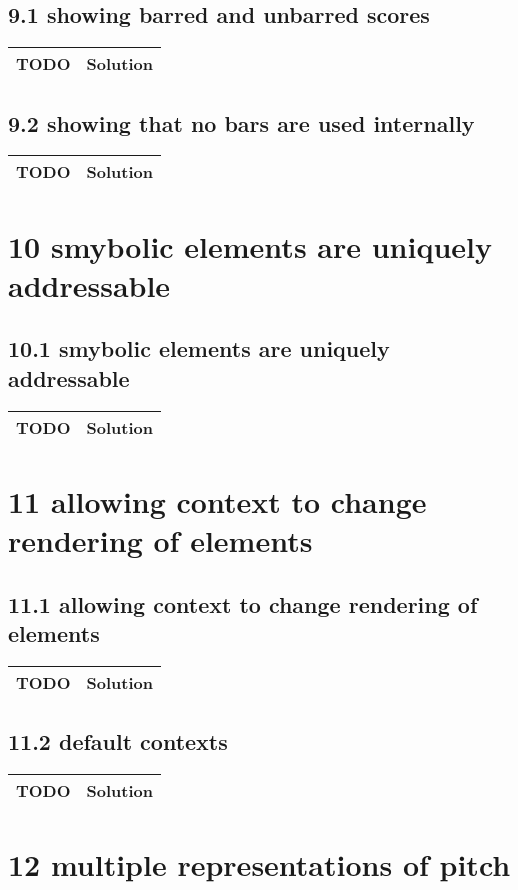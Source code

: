  \subsection*{9.1 showing barred and unbarred scores}
 \begin{tabular}{|p{}|p{}|}
 \hline
 \textbf{TODO} &
 \textbf{Solution} 
\\
 \hline
 \end{tabular} \subsection*{9.2 showing that no bars are used internally}
 \begin{tabular}{|p{}|p{}|}
 \hline
 \textbf{TODO} &
 \textbf{Solution} 
\\
 \hline
 \end{tabular} \section*{10 smybolic elements are uniquely addressable}
 \subsection*{10.1 smybolic elements are uniquely addressable}
 \begin{tabular}{|p{}|p{}|}
 \hline
 \textbf{TODO} &
 \textbf{Solution} 
\\
 \hline
 \end{tabular} \section*{11 allowing context to change rendering of elements}
 \subsection*{11.1 allowing context to change rendering of elements}
 \begin{tabular}{|p{}|p{}|}
 \hline
 \textbf{TODO} &
 \textbf{Solution} 
\\
 \hline
 \end{tabular} \subsection*{11.2 default contexts}
 \begin{tabular}{|p{}|p{}|}
 \hline
 \textbf{TODO} &
 \textbf{Solution} 
\\
 \hline
 \end{tabular} \section*{12 multiple representations of pitch}
